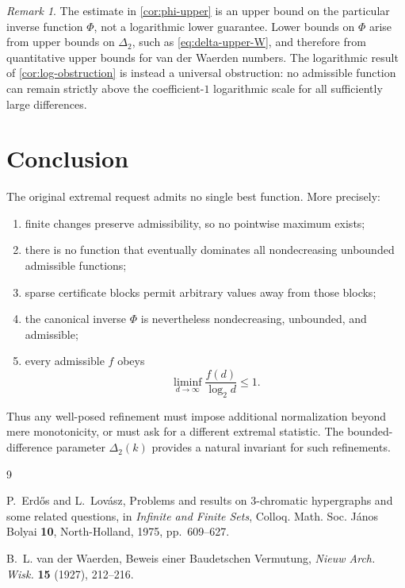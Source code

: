 \documentclass[11pt]{article}
\theoremstyle{definition}
\theoremstyle{remark}
\newtheorem{remark}[theorem]{Remark}
\newcommand{\DeltaTwo}{\Delta_{2}}
\newcommand{\PhiTwo}{\Phi}
\begin{document}
\begin{remark}\label{rem:inverse-meaning}
The estimate in \cref{cor:phi-upper} is an upper bound on the particular inverse function $\PhiTwo$, not a logarithmic lower guarantee. Lower bounds on $\PhiTwo$ arise from upper bounds on $\DeltaTwo$, such as \eqref{eq:delta-upper-W}, and therefore from quantitative upper bounds for van der Waerden numbers. The logarithmic result of \cref{cor:log-obstruction} is instead a universal obstruction: no admissible function can remain strictly above the coefficient-$1$ logarithmic scale for all sufficiently large differences.
\end{remark}

\section{Conclusion}

The original extremal request admits no single best function. More precisely:
\begin{enumerate}
\item finite changes preserve admissibility, so no pointwise maximum exists;
\item there is no function that eventually dominates all nondecreasing unbounded admissible functions;
\item sparse certificate blocks permit arbitrary values away from those blocks;
\item the canonical inverse $\PhiTwo$ is nevertheless nondecreasing, unbounded, and admissible;
\item every admissible $f$ obeys
\[
\liminf_{d\to\infty}\frac{f(d)}{\log_2d}\le1.
\]
\end{enumerate}
Thus any well-posed refinement must impose additional normalization beyond mere monotonicity, or must ask for a different extremal statistic. The bounded-difference parameter $\DeltaTwo(k)$ provides a natural invariant for such refinements.

\begin{thebibliography}{9}

P.~Erd\H{o}s and L.~Lov\'asz,
\newblock Problems and results on $3$-chromatic hypergraphs and some related questions,
\newblock in \emph{Infinite and Finite Sets}, Colloq. Math. Soc. J\'anos Bolyai \textbf{10}, North-Holland, 1975, pp.~609--627.

B.~L. van der Waerden,
\newblock Beweis einer Baudetschen Vermutung,
\newblock \emph{Nieuw Arch. Wisk.} \textbf{15} (1927), 212--216.

\end{thebibliography}
\end{document}
